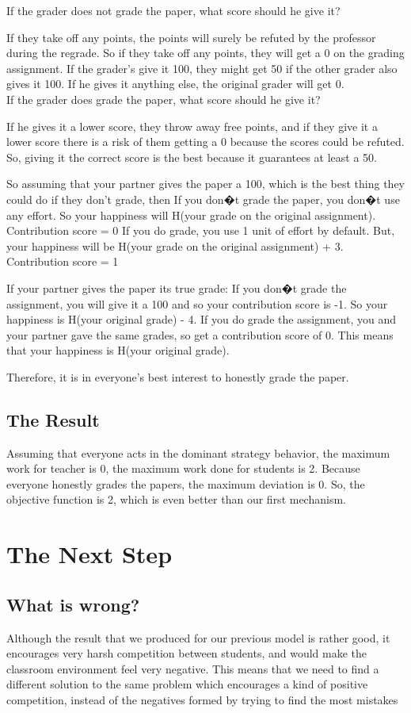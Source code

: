 \documentclass[12pt, Helvetica]{article}
\begin{document}
If the grader does not grade the paper, what score should he give it?

If they take off any points, the points will surely be refuted by the professor during the regrade.
So if they take off any points, they will get a 0 on the grading assignment.
If the grader's give it 100, they might get 50 if the other grader also gives it 100. If he gives it anything else, the original grader will get 0.
$$$$
If the grader does grade the paper, what score should he give it?

If he gives it a lower score, they throw away free points, and if they give it a lower score there is a risk of them getting a 0 because the scores could be refuted. So, giving it the correct score is the best because it guarantees at least a 50.

So assuming that your partner gives the paper a 100, which is the best thing they could do if they don't grade, then
	If you don�t grade the paper, you don�t use any effort. So your happiness will H(your grade on the original assignment). Contribution score = 0
	If you do grade, you use 1 unit of effort by default. But, your happiness will be H(your grade on the original assignment) + 3. Contribution score = 1
	
If your partner gives the paper its true grade:
	If you don�t grade the assignment, you will give it a 100 and so your contribution score is -1. So your happiness is H(your original grade) - 4.
	If you do grade the assignment, you and your partner gave the same grades, so get a contribution score of 0. This means that your happiness is H(your original grade). 
	
Therefore, it is in everyone's best interest to honestly grade the paper. 
\subsection{The Result}
Assuming that everyone acts in the dominant strategy behavior, the maximum work for teacher is 0, the maximum work done for students is 2. 
Because everyone honestly grades the papers, the maximum deviation is 0.
So, the objective function is 2, which is even better than our first mechanism.
\section{The Next Step}
\subsection{What is wrong?}
Although the result that we produced for our previous model is rather good, it encourages very harsh competition between students, and would make the classroom environment feel very negative. This means that we need to find a different solution to the same problem which encourages a kind of positive competition, instead of the negatives formed by trying to find the most mistakes
\end{document}
